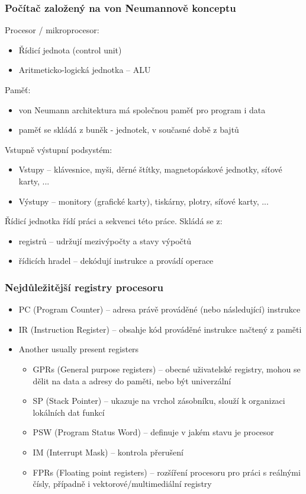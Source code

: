 \documentclass{beamer}
\begin{document}
\begin{frame}
\frametitle{Počítač založený na von Neumannově konceptu}

Procesor / mikroprocesor:
\begin{itemize}
\item Řídicí jednota (control unit)
\item Aritmeticko-logická jednotka -- ALU
\end{itemize}

Paměť: 
\begin{itemize}
\item von Neumann architektura má společnou paměť pro program i data
\item paměť se skládá z buněk - jednotek, v současné době z bajtů
\end{itemize}

Vstupně výstupní podsystém:
\begin{itemize}
\item Vstupy -- klávesnice, myši, děrné štítky, magnetopáskové jednotky, síťové karty, ...
\item Výstupy -- monitory (grafické karty), tiskárny, plotry, síťové karty, ...
\end{itemize}

Řídicí jednotka řídí práci a sekvenci této práce. Skládá se z:
\begin{itemize}
\item registrů – udržují mezivýpočty a stavy výpočtů
\item řídicích hradel -- dekódují instrukce a provádí operace
\end{itemize}
\end{frame}


\begin{frame}
\frametitle{Nejdůležitější registry procesoru}
\begin{itemize}
\item PC (Program Counter) -- adresa právě prováděné (nebo následující) instrukce
\item IR (Instruction Register) -- obsahje kód prováděné instrukce načtený z paměti
\item Another usually present registers
\begin{itemize}
\item GPRs (General purpose registers) -- obecné uživatelské registry, mohou se dělit na data a adresy do paměti, nebo být univerzální
\item SP (Stack Pointer) -- ukazuje na vrchol zásobníku, slouží k organizaci lokálních dat funkcí
\item PSW (Program Status Word) -- definuje v jakém stavu je procesor
\item IM (Interrupt Mask) -- kontrola přerušení
\item FPRs (Floating point registers) -- rozšíření procesoru pro práci s reálnými čísly, případně i vektorové/multimediální registry
\end{itemize}
\end{itemize}
\end{frame}
\end{document}
